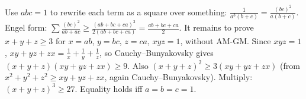 \documentclass[11pt,a4paper]{article}
\begin{document}
 Use $abc=1$ to rewrite each term as a square over something: $\frac1{a^3(b+c)}=\frac{(bc)^2}{a(b+c)}$.
 Engel form: $\sum\frac{(bc)^2}{ab+ac}\ge\frac{(ab+bc+ca)^2}{2(ab+bc+ca)}=\frac{ab+bc+ca}2$. It remains to prove $x+y+z\ge3$ for $x=ab$, $y=bc$, $z=ca$, $xyz=1$, without AM-GM.
 Since $xyz=1$, $xy+yz+zx=\frac1x+\frac1y+\frac1z$, so Cauchy--Bunyakovsky gives $(x+y+z)(xy+yz+zx)\ge9$. Also $(x+y+z)^2\ge3(xy+yz+zx)$ (from $x^2+y^2+z^2\ge xy+yz+zx$, again Cauchy--Bunyakovsky). Multiply: $(x+y+z)^3\ge27$. Equality holds iff $a=b=c=1$.
\end{document}
